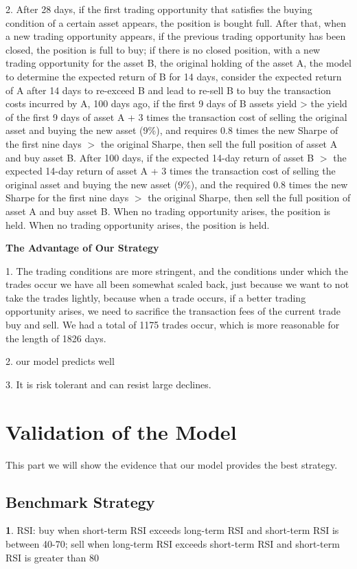 \documentclass[12pt]{article}
\begin{document}
    2. After 28 days, if the first trading opportunity that satisfies the buying condition of a certain asset appears, the position is bought full. After that, when a new trading opportunity appears, if the previous trading opportunity has been closed, the position is full to buy; if there is no closed position, with a new trading opportunity for the asset B, the original holding of the asset A, the model to determine the expected return of B for 14 days, consider the expected return of A after 14 days to re-exceed B and lead to re-sell B to buy the transaction costs incurred by A, 100 days ago, if the first 9 days of B assets yield > the yield of the first 9 days of asset A + 3 times the transaction cost of selling the original asset and buying the new asset (9\%), and requires 0.8 times the new Sharpe of the first nine days $>$ the original Sharpe, then sell the full position of asset A and buy asset B. After 100 days, if the expected 14-day return of asset B $>$ the expected 14-day return of asset A + 3 times the transaction cost of selling the original asset and buying the new asset (9\%), and the required 0.8 times the new Sharpe for the first nine days $>$ the original Sharpe, then sell the full position of asset A and buy asset B. When no trading opportunity arises, the position is held. When no trading opportunity arises, the position is held.
    
    \noindent\textbf{The Advantage of Our Strategy}
    
    1. The trading conditions are more stringent, and the conditions under which the trades occur we have all been somewhat scaled back, just because we want to not take the trades lightly, because when a trade occurs, if a better trading opportunity arises, we need to sacrifice the transaction fees of the current trade buy and sell.
    We had a total of 1175 trades occur, which is more reasonable for the length of 1826 days.
    
    2. our model predicts well
    
    3. It is risk tolerant and can resist large declines. 

    
    \section{Validation of the Model}
    This part we will show the evidence that our model provides the best strategy.
    
    \subsection{Benchmark Strategy}
    \noindent\textbf{1}. RSI: buy when short-term RSI exceeds long-term RSI and short-term RSI is between 40-70; sell when long-term RSI exceeds short-term RSI and short-term RSI is greater than 80
    
\end{document}

